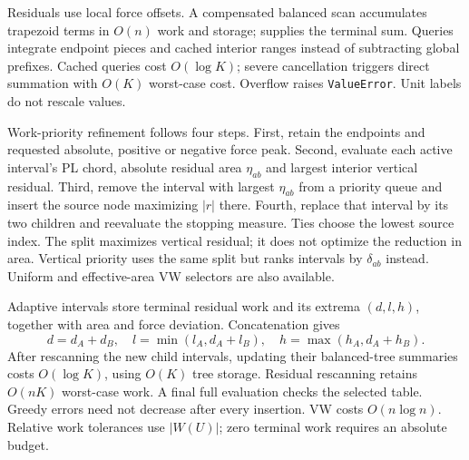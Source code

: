 \documentclass[preprint,12pt,a4paper]{elsarticle}
\begin{document}
Residuals use local force offsets. A compensated balanced scan accumulates trapezoid terms in $O(n)$ work and storage;  supplies the terminal sum. Queries integrate endpoint pieces and cached interior ranges instead of subtracting global prefixes. Cached queries cost $O(\log K)$; severe cancellation triggers direct summation with $O(K)$ worst-case cost. Overflow raises \texttt{ValueError}. Unit labels do not rescale values.

Work-priority refinement follows four steps. First, retain the endpoints and requested absolute, positive or negative force peak. Second, evaluate each active interval's PL chord, absolute residual area $\eta_{ab}$ and largest interior vertical residual. Third, remove the interval with largest $\eta_{ab}$ from a priority queue and insert the source node maximizing $|r|$ there. Fourth, replace that interval by its two children and reevaluate the stopping measure. Ties choose the lowest source index. The split maximizes vertical residual; it does not optimize the reduction in area. Vertical priority uses the same split but ranks intervals by $\delta_{ab}$ instead. Uniform and effective-area VW selectors are also available.

Adaptive intervals store terminal residual work and its extrema $(d,l,h)$, together with area and force deviation. Concatenation gives
\begin{equation}
d=d_A+d_B,\quad l=\min(l_A,d_A+l_B),\quad h=\max(h_A,d_A+h_B).\label{eq:composition}
\end{equation}
After rescanning the new child intervals, updating their balanced-tree summaries costs $O(\log K)$, using $O(K)$ tree storage. Residual rescanning retains $O(nK)$ worst-case work. A final full evaluation checks the selected table. Greedy errors need not decrease after every insertion. VW costs $O(n\log n)$. Relative work tolerances use $|W(U)|$; zero terminal work requires an absolute budget.
\end{document}
